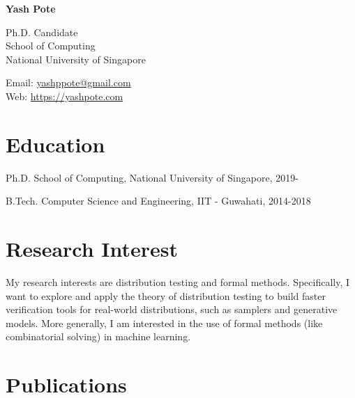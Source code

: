 \documentclass[12pt,letterpaper]{report}
\newcommand{\myname}{Yash Pote}
\newcommand{\namefont}[1]{{\normalfont\bfseries\Huge{#1}}}
\begin{document}
	\raggedright
	
	\namefont{\myname}
	
	\vspace{1em}
	\begin{minipage}[t]{0.68\textwidth}
		Ph.D. Candidate \\
		School of Computing \\
		National University of Singapore
	\end{minipage}
	\begin{minipage}[t]{0.31\textwidth}
		Email: \href{mailto:yashppote@gmail.com}{yashppote@gmail.com} \\
		Web: \href{https://yashpote.com}{https://yashpote.com}
	\end{minipage}
	\vspace{0.5em}
	
	
	
	\section*{Education}
	
	\begin{tablist}
		
		\item[Ph.D.] \tab School of Computing, National University of Singapore, 2019-
		
		\item[B.Tech.]  \tab Computer Science and Engineering, IIT - Guwahati, 2014-2018
	\end{tablist}
	
	
	\section*{Research Interest}
	
My  research interests are distribution testing and formal methods. Specifically, I want to explore and apply the theory of distribution testing to build faster verification tools for real-world distributions, such as samplers and generative models. More generally, I am interested in the use of formal methods (like combinatorial solving) in machine learning.
	
	
	
	\section*{Publications}
	
\end{document}
